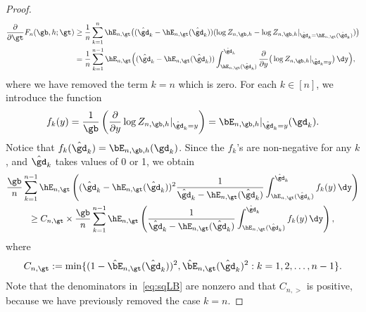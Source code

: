 \begin{proof}
\begin{align}
\begin{aligned}
\frac{\partial}{\partial \gt} F_n(\gb,h;\gt) &\geq
\frac{1}{n} \sum_{k=1}^n \hE_{n,\gt} \big((\hat \gd_k - \hE_{n,\gt} (\hat \gd_k)) (\log Z_{n,\gb,h} - \log Z_{n,\gb,h}|_{\hat \gd_k = \hE_{n,\gt} (\hat \gd_k)}) \big)\\
&= \frac{1}{n} \sum_{k=1}^{n-1} \hE_{n,\gt} \Big((\hat \gd_k - \hE_{n,\gt} (\hat \gd_k)) \int_{\hE_{n,\gt}(\hat \gd_k)}^{\hat \gd_k} \frac{\partial}{\partial y} \big(\log Z_{n,\gb,h}|_{\hat \gd_k = y} \big) \, \dy \Big),
\end{aligned}
\end{align}
where we have removed the term $k=n$ which is zero. For each $k \in [n]$, we introduce the function
\begin{equation}\label{eq:eqfk}
f_k(y) = \frac{1}{\gb} \left(\frac{\partial}{\partial y} \log Z_{n,\gb,h}|_{\hat \gd_k = y} \right) = \bE_{n,\gb,h}|_{\hat \gd_k = y} (\gd_k).
\end{equation}
Notice that $f_k(\hat \gd_k) = \bE_{n,\gb,h} (\gd_k)$. Since the $f_k$'s are non-negative for any $k$, and $\hat \gd_k$ takes values of 0 or 1, we obtain
\begin{multline}\label{eq:sqLB}
\frac{\gb}{n} \sum_{k=1}^{n-1} \hE_{n,\gt} \left((\hat \gd_k - \hE_{n,\gt} (\hat \gd_k))^2 \frac{1}{\hat \gd_k - \hE_{n,\gt} (\hat \gd_k)} \int_{\hE_{n,\gt} (\hat \gd_k)}^{\hat \gd_k} f_k(y) \, \dy \right)\\
\geq C_{n,\gt} \times \frac{\gb}{n} \sum_{k=1}^{n-1} \hE_{n,\gt} \left(\frac{1}{\hat\gd_k - \hE_{n,\gt} (\hat\gd_k)} \int_{\hE_{n,\gt} (\hat\gd_k)}^{\hat\gd_k} f_k(y) \, \dy \right),
\end{multline}
where
\begin{equation}
C_{n,\gt} := \min\{(1 - \hat\bE_{n,\gt} (\hat\gd_k))^2, \hat\bE_{n,\gt} (\hat\gd_k)^2 : k=1, 2, \ldots, { n-1}\}.
\end{equation}
Note that the denominators in~\eqref{eq:sqLB} are nonzero and that $C_{n,\gt}$ is positive, because we have previously removed the case $k=n$.


\end{proof}
